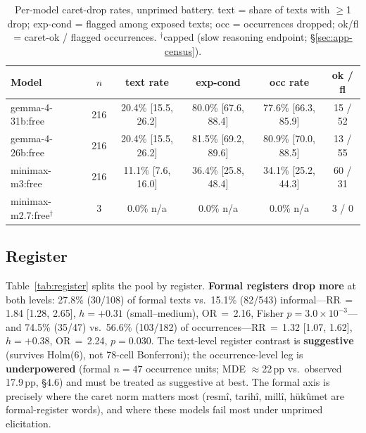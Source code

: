 \documentclass[11pt]{article}
\begin{document}
\begin{table}[t]
\centering
\small
\begin{tabular}{lccccc}
\toprule
Model & $n$ & text rate & exp-cond & occ rate & ok / fl \\
\midrule
gemma-4-31b:free & 216 & 20.4\% [15.5, 26.2] & 80.0\% [67.6, 88.4] & 77.6\% [66.3, 85.9] & 15 / 52 \\
gemma-4-26b:free & 216 & 20.4\% [15.5, 26.2] & 81.5\% [69.2, 89.6] & 80.9\% [70.0, 88.5] & 13 / 55 \\
minimax-m3:free & 216 & 11.1\% [7.6, 16.0] & 36.4\% [25.8, 48.4] & 34.1\% [25.2, 44.3] & 60 / 31 \\
minimax-m2.7:free$^{\dagger}$ & 3 & 0.0\% n/a & 0.0\% n/a & 0.0\% n/a & 3 / 0 \\
\bottomrule
\end{tabular}
\caption{Per-model caret-drop rates, unprimed battery. text = share of texts with $\geq$1 drop; exp-cond = flagged among exposed texts; occ = occurrences dropped; ok/fl = caret-ok / flagged occurrences. $^{\dagger}$capped (slow reasoning endpoint; \S\ref{sec:app-census}).}
\label{tab:models}
\end{table}

\subsection{Register}

Table~\ref{tab:register} splits the pool by register. \textbf{Formal registers drop more} at both levels: 27.8\% (30/108) of formal texts vs.\ 15.1\% (82/543) informal---RR\,$=$\,1.84 [1.28, 2.65], $h{=}+0.31$ (small--medium), OR\,$=$\,2.16, Fisher $p{=}3.0\times10^{-3}$---and 74.5\% (35/47) vs.\ 56.6\% (103/182) of occurrences---RR\,$=$\,1.32 [1.07, 1.62], $h{=}+0.38$, OR\,$=$\,2.24, $p{=}0.030$. The text-level register contrast is \textbf{suggestive} (survives Holm(6), not 78-cell Bonferroni); the occurrence-level leg is \textbf{underpowered} (formal $n{=}47$ occurrence units; MDE $\approx$22\,pp vs.\ observed 17.9\,pp, \S4.6) and must be treated as suggestive at best. The formal axis is precisely where the caret norm matters most (resm{\^i}, tarih{\^i}, mill{\^i}, h{\"u}k{\^u}met are formal-register words), and where these models fail most under unprimed elicitation.
\end{document}
